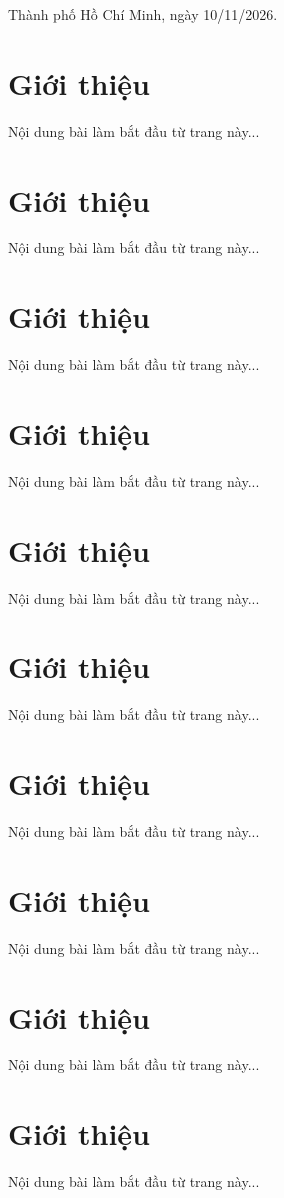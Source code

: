 \documentclass[a4paper, 12pt]{article}
\begin{document}
\begin{titlepage}
    \vfill %

    {\fontsize{12}{10}\selectfont Thành phố Hồ Chí Minh, ngày 10/11/2026.}
\end{titlepage}

\clearpage
{}
\renewcommand{\contentsname}{\hfil MỤC LỤC \hfil}
\tableofcontents %
\clearpage
{} %

\section{Giới thiệu}
Nội dung bài làm bắt đầu từ trang này...
\section{Giới thiệu}
Nội dung bài làm bắt đầu từ trang này...
\section{Giới thiệu}
Nội dung bài làm bắt đầu từ trang này...
\section{Giới thiệu}
Nội dung bài làm bắt đầu từ trang này...
\section{Giới thiệu}
Nội dung bài làm bắt đầu từ trang này...
\section{Giới thiệu}
Nội dung bài làm bắt đầu từ trang này...
\section{Giới thiệu}
Nội dung bài làm bắt đầu từ trang này...
\section{Giới thiệu}
Nội dung bài làm bắt đầu từ trang này...
\section{Giới thiệu}
Nội dung bài làm bắt đầu từ trang này...
\section{Giới thiệu}
Nội dung bài làm bắt đầu từ trang này...
\end{document}
